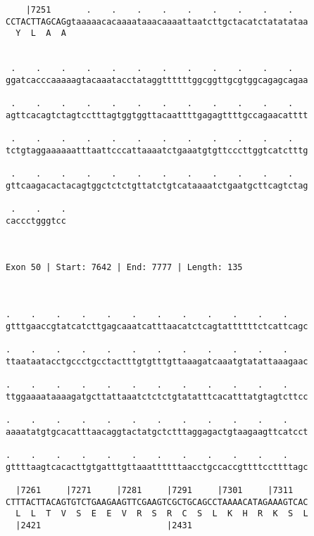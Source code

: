 \documentclass{article}
\begin{document}
\begin{Verbatim}
    |7251       .    .    .    .    .    .    .    .    .   
CCTACTTAGCAGgtaaaaacacaaaataaacaaaattaatcttgctacatctatatataa
  Y  L  A  A                                                
                                                            
  
 .    .    .    .    .    .    .    .    .    .    .    .   
ggatcacccaaaaagtacaaatacctataggttttttggcggttgcgtggcagagcagaa
                                                            
 .    .    .    .    .    .    .    .    .    .    .    .   
agttcacagtctagtcctttagtggtggttacaattttgagagttttgccagaacatttt
                                                            
 .    .    .    .    .    .    .    .    .    .    .    .   
tctgtaggaaaaaatttaattcccattaaaatctgaaatgtgttcccttggtcatctttg
                                                            
 .    .    .    .    .    .    .    .    .    .    .    .   
gttcaagacactacagtggctctctgttatctgtcataaaatctgaatgcttcagtctag
                                                            
 .    .    .
caccctgggtcc
            
            
 
Exon 50 | Start: 7642 | End: 7777 | Length: 135



.    .    .    .    .    .    .    .    .    .    .    .    
gtttgaaccgtatcatcttgagcaaatcatttaacatctcagtattttttctcattcagc
                                                            
.    .    .    .    .    .    .    .    .    .    .    .    
ttaataatacctgccctgcctactttgtgtttgttaaagatcaaatgtatattaaagaac
                                                            
.    .    .    .    .    .    .    .    .    .    .    .    
ttggaaaataaaagatgcttattaaatctctctgtatatttcacatttatgtagtcttcc
                                                            
.    .    .    .    .    .    .    .    .    .    .    .    
aaaatatgtgcacatttaacaggtactatgctctttaggagactgtaagaagttcatcct
                                                            
.    .    .    .    .    .    .    .    .    .    .    .    
gttttaagtcacacttgtgatttgttaaattttttaacctgccaccgttttccttttagc
                                                            
  |7261     |7271     |7281     |7291     |7301     |7311   
CTTTACTTACAGTGTCTGAAGAAGTTCGAAGTCGCTGCAGCCTAAAACATAGAAAGTCAC
  L  L  T  V  S  E  E  V  R  S  R  C  S  L  K  H  R  K  S  L
  |2421                         |2431                       
  

\end{Verbatim}
\end{document}
